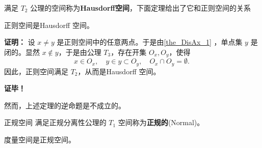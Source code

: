 满足 $T_2$ 公理的空间称为\textbf{Hausdorff空间}，下面定理给出了它和正则空间的关系
\begin{theorem}{}
正则空间是Hausdorff 空间。
\end{theorem}
\textbf{证明：}
设 $x\neq y$ 是正则空间中的任意两点。于是由\autoref{the_DisAx_1} ，单点集 $y$ 是闭的。显然 $x\notin y$，于是由公理 $T_3$，存在开集 $O_x,O_y$，使得
\begin{equation}
x\in O_x, \quad y\in y\subset O_y, \quad O_x\cap O_y=\emptyset.~
\end{equation}
因此，正则空间满足 $T_2$，从而是Hausdorff 空间。

\textbf{证毕！}

然而，上述定理的逆命题是不成立的。


\begin{definition}{正规空间}
满足正规分离性公理的 $T_1$ 空间称为\textbf{正规的}(Normal)。
\end{definition}

\begin{theorem}{}
度量空间是正规空间。
\end{theorem}




